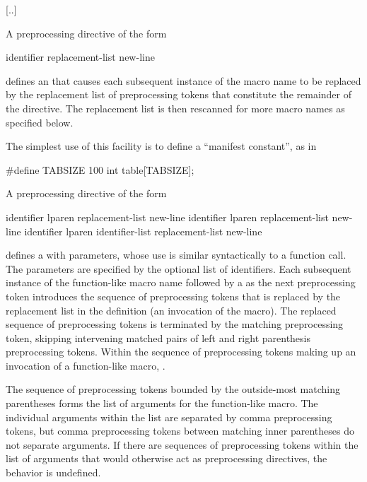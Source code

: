 \documentclass{wg21}
\begin{document}
[..]

\pnum
A preprocessing directive of the form
\begin{ncsimplebnf}
     identifier replacement-list new-line
\end{ncsimplebnf}
defines an
 that
causes each subsequent instance of the macro name
to be replaced by the replacement list of preprocessing tokens
that constitute the remainder of the directive.
The replacement list is then rescanned for more macro names as
specified below.

\pnum
\begin{example}
    The simplest use of this facility is to define a ``manifest constant'',
    as in
    \begin{codeblock}
        #define TABSIZE 100
        int table[TABSIZE];
    \end{codeblock}
\end{example}

\pnum
A preprocessing directive of the form
\begin{ncsimplebnf}
     identifier lparen  \terminal{)} replacement-list new-line\br
     identifier lparen  \terminal{)} replacement-list new-line\br
     identifier lparen identifier-list  \terminal{)} replacement-list new-line
\end{ncsimplebnf}
defines a 
with parameters, whose use is
similar syntactically to a function call.
The parameters
%
are specified by the optional list of identifiers.
Each subsequent instance of the function-like macro name followed by a
\tcode{(}
as the next preprocessing token
introduces the sequence of preprocessing tokens that is replaced
by the replacement list in the definition
(an invocation of the macro).
%
The replaced sequence of preprocessing tokens is terminated by the matching
\tcode{)}
preprocessing token, skipping intervening matched pairs of left and
right parenthesis preprocessing tokens.
Within the sequence of preprocessing tokens making up an invocation
of a function-like macro, .

\pnum
{}%
The sequence of preprocessing tokens
bounded by the outside-most matching parentheses
forms the list of arguments for the function-like macro.
The individual arguments within the list
are separated by comma preprocessing tokens,
but comma preprocessing tokens between matching
inner parentheses do not separate arguments.
If there are sequences of preprocessing tokens within the list of
arguments that would otherwise act as preprocessing directives,
the behavior is undefined.
\end{document}
